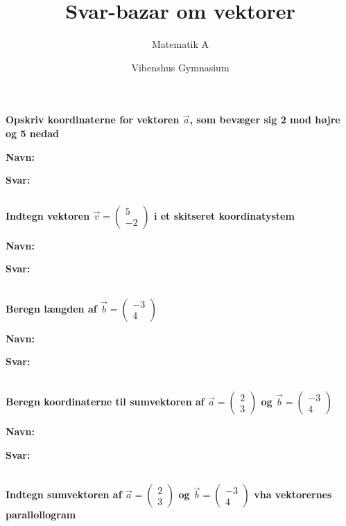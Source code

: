 \documentclass[a4paper, 12pt]{article}
\author{Matematik A}
\date{Vibenshus Gymnasium}
\title{Svar-bazar om vektorer}
\begin{document}
\maketitle
\textbf{Opskriv koordinaterne for vektoren \(\vec{a}\), som bevæger sig 2 mod højre og 5 nedad}


\textbf{Navn:}

\textbf{Svar:}

$\phantom{a}$\\
$\phantom{a}$\\

\textbf{Indtegn vektoren \(\vec{v} = \begin{pmatrix} 5 \\ -2 \end{pmatrix}\) i et skitseret koordinatystem}

\textbf{Navn:}

\textbf{Svar:}

$\phantom{a}$\\
$\phantom{a}$\\
$\phantom{a}$\\

\textbf{Beregn længden af \(\vec{b} = \begin{pmatrix}-3\\4 \end{pmatrix}\)}

\textbf{Navn:}

\textbf{Svar:}

$\phantom{a}$\\
$\phantom{a}$\\
$\phantom{a}$\\

\textbf{Beregn koordinaterne til sumvektoren af \(\vec{a}= \begin{pmatrix} 2\\3 \end{pmatrix}\) og \(\vec{b}=\begin{pmatrix} -3 \\ 4 \end{pmatrix}\)}

\textbf{Navn:}

\textbf{Svar:}

$\phantom{a}$\\
$\phantom{a}$\\
$\phantom{a}$\\

\textbf{Indtegn sumvektoren af \(\vec{a}= \begin{pmatrix} 2\\3 \end{pmatrix}\) og \(\vec{b}=\begin{pmatrix} -3 \\ 4 \end{pmatrix}\) vha vektorernes parallollogram}
\end{document}

